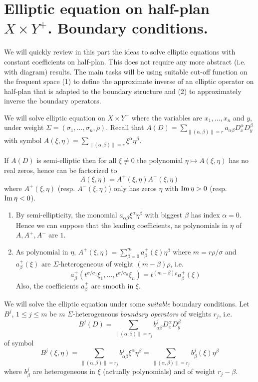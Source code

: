 \section{Elliptic equation on half-plan \(X\times Y^+\). Boundary conditions.} \label{ell-half-plan}
\label{sec:org0deb1e7}
We will quickly review in this part the ideas to solve elliptic equations with constant
coefficients on half-plan. This does not require any more abstract (i.e. with diagram)
results. The main tasks will be using suitable cut-off function on the frequent space (1)
to define the approximate inverse of an elliptic operator on half-plan that is adapted to
the boundary structure and (2) to approximately inverse the boundary operators.

We will solve elliptic equation on \(X\times Y^+\) where the variables are \(x_1,\dots,
x_n\) and \(y\), under weight \(\Sigma = (\sigma_1,\dots, \sigma_n,\rho)\). Recall
that \(A(D) = \sum_{\|(\alpha,\beta)\|=r}a_{\alpha \beta}D^\alpha_x D^\beta_y\) with
symbol \(A(\xi,\eta)=\sum_{\|(\alpha,\beta)\|=r}\xi^\alpha\eta^\beta\).

If \(A(D)\) is semi-elliptic then for all \(\xi \ne 0\) the polynomial \(\eta \mapsto
A(\xi,\eta)\) has no real zeros, hence can be factorized to
\[
 A(\xi,\eta)=A^+(\xi,\eta)A^-(\xi,\eta)
\]
where \(A^+(\xi,\eta)\) (resp. \(A^-(\xi,\eta)\)) only has zeros \(\eta\) with \(\mathop{\rm Im}\nolimits\eta >0\) (resp. \(\mathop{\rm Im}\nolimits \eta <0\)).

\begin{remark}
\begin{enumerate}
\item By semi-ellipticity, the monomial \(a_{\alpha\beta}\xi^\alpha \eta^\beta\) with biggest \(\beta\) has
index \(\alpha = 0\). Hence we can suppose that the leading coefficients, as
polynomials in \(\eta\) of \(A, A^+, A^-\) are \(1\).
\item As polynomial in \(\eta\), \(A^+(\xi,\eta)=\sum_{\beta=0}^m a^+_\beta(\xi)\eta^\beta\) where \(m=r\rho/\sigma\) and \(a^+_\beta(\xi)\) are \(\Sigma\)-heterogeneous
of weight \((m-\beta)\rho\), i.e. 
\[
    a^+_\beta(t^{\sigma/\sigma_1}\xi_1,\dots,t^{\sigma/\sigma_n}\xi_n) = t^{(m-\beta)\rho}a^+_\beta(\xi)
   \]
 Also, the coefficients \(a^+_\beta\) are smooth in \(\xi\).
\end{enumerate}
\end{remark}

We will solve the elliptic equation under some \emph{suitable} boundary conditions. Let \(B^j\), \(1\leq j\leq m\) be \(m\) \(\Sigma\)-heterogeneous \emph{boundary operators} of
weights \(r_j\), i.e.
\[
B^j(D) = \sum_{\|(\alpha,\beta)\| = r_j} b^j_{\alpha\beta}D^\alpha_x D^\beta_y
\]
of symbol 
\[ 
B^j(\xi,\eta) = \sum_{\|(\alpha,\beta)\| = r_j} b^j_{\alpha\beta}\xi^\alpha
\eta^\beta = \sum_{\|(\alpha,\beta)\| = r_j} b^j_{\beta}(\xi)\eta^\beta  
\]
where \(b_\beta^j\) are heterogeneous in \(\xi\) (actually polynomials) and of weight \(r_j-\beta\).


